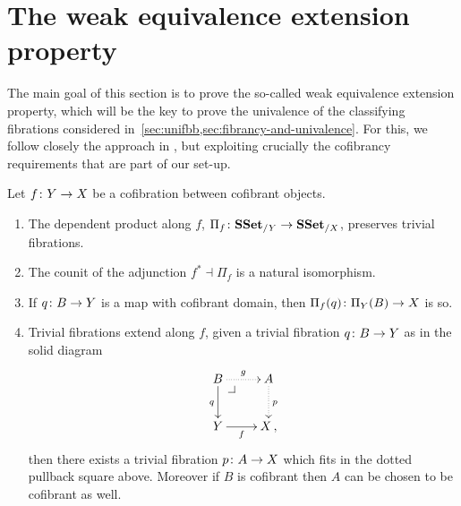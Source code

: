 \documentclass[reqno,10pt,a4paper,oneside,draft]{amsart}
\begin{document}
\section{The weak equivalence extension property}
\label{sec:equep}

The main goal of this section is to prove the so-called weak equivalence extension property, which will be the key to prove the univalence of the classifying fibrations considered in~\cref{sec:unifbb,sec:fibrancy-and-univalence}.  For this, we follow closely the approach in \cite{voevodsky-simplicial-model}, but exploiting crucially the cofibrancy requirements that are part of our set-up.



\begin{lemma}\label{Lemma:ForTheExtProperty} Let  $f \colon Y \rightarrow X$ be a cofibration between
cofibrant objects. 
\begin{enumerate}[$(i)$]
\item The dependent product along $f$, $\Pi_f \colon \mathbf{SSet}_{/Y} \rightarrow \mathbf{SSet}_{/X}$, preserves trivial fibrations.
\item The counit of the adjunction $f^* \dashv \Pi_f$ is a natural isomorphism.
\item If $q \colon B \to Y$ is a map with cofibrant domain, then $\Pi_f(q) \colon \Pi_Y(B) \to X$  is so.
\item Trivial fibrations extend along $f$, \ie given a trivial fibration $q
 \colon B \to Y$  as in the solid diagram
\[
\xymatrix{
B \ar@{.>}[r]^{g} \ar[d]_{q} \drpullback  & A \ar@{.>}[d]^{p} \\
Y \ar[r]_-f &  X \, ,}
\]
then there exists a trivial fibration $p \colon A \rightarrow X$ which fits in the dotted pullback square above. Moreover if $B$ is cofibrant  then 
$A$ can be chosen to be 
cofibrant as well.
\end{enumerate}
\end{lemma}
\end{document}
